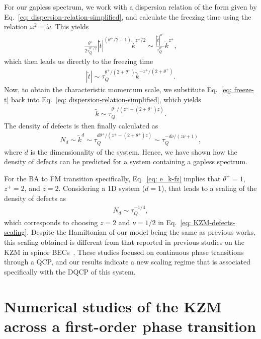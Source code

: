 For our gapless spectrum, we work with a dispersion relation of the form given
by Eq.~\eqref{eq: dispersion-relation-simplified}, and calculate the freezing
time using the relation \(\omega^2 = \dot{\omega}\).
This yields
\begin{align}
    \frac{\theta^+}{2\tau_Q^{\theta^+/2}}|\tilde{t}|^{(\theta^+/2 - 1)}
    \tilde{k}^{z^+/2} \sim \frac{|\tilde{t}|^{\theta^+}}{\tau_Q^{\theta^+}}
    \tilde{k}^{z^+},
\end{align}
which then leads us directly to the freezing time
\begin{align}\label{eq: freeze-t}   
    |\tilde{t}| \sim \tau_Q^{\theta^+/(2+\theta^+)}
    \tilde{k}^{-z^+/(2+\theta^+)}.
\end{align}
Now, to obtain the characteristic momentum scale, we substitute
Eq.~\eqref{eq: freeze-t} back into
Eq.~\eqref{eq: dispersion-relation-simplified}, which yields
\begin{align}
    \tilde{k} \sim \tau_Q^{\theta^+/(z^+-(2+\theta^+)z)}.
\end{align}
The density of defects is then finally calculated as
\begin{align}
    N_d \sim \tilde{k}^d \sim \tau_Q^{d\theta^+/(z^+-(2+\theta^+)z)} \sim
    \tau_Q^{-d\nu/(z\nu + 1)},
\end{align}
where \(d\) is the dimensionality of the system.
Hence, we have shown how the density of defects can be predicted for a system
containing a gapless spectrum.

For the BA to FM transition specifically, Eq.~\eqref{eq: e_k-fz} implies that
\(\theta^+=1\), \(z^+=2\), and \(z = 2\).
Considering a 1D system (\(d = 1\)), that leads to a scaling of the density of
defects as
\begin{align}
    N_d \sim\tau_Q^{-1/4},
\end{align}
which corresponds to choosing \(z=2\) and \(\nu = 1/2\) in
Eq.~\eqref{eq: KZM-defects-scaling}.
Despite the Hamiltonian of our model being the same as previous works, this
scaling obtained is different from that reported in previous studies on the KZM
in spinor BECs~\cite{Damski2007,Saito2007,Saito2007a,Saito2013,Swislocki2013}.
These studies focused on continuous phase transitions through a QCP\@, and our
results indicate a new scaling regime that is associated specifically with the
DQCP of this system.

\section{Numerical studies of the KZM across a first-order phase transition}
